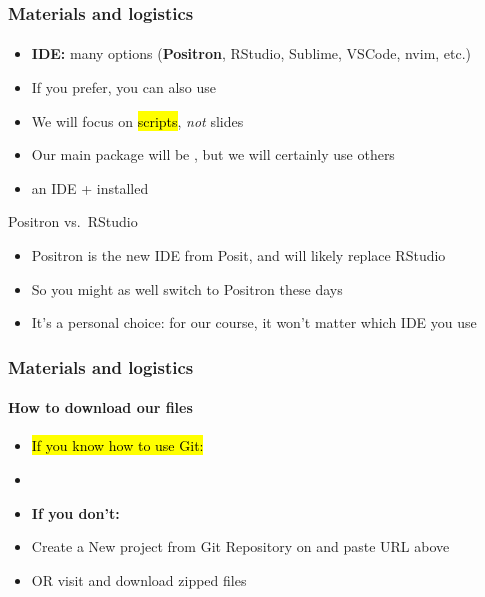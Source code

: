 \documentclass[xcolor=dvipsnames, handout, onlymath, 10pt, aspectratio=169]{beamer}
\begin{document}
\begin{frame}
	\frametitle{Materials and logistics}
	\framesubtitle{}

	\begin{itemize}
		\item[\winner] \textbf{IDE:} many options (\textbf{Positron}, RStudio, Sublime, VSCode, nvim, etc.)
		\item If you prefer, you can also use 
		\item We will focus on \hl{scripts}, \textit{not} slides
		\item Our main package will be , but we will certainly use others 
		\item[]  an IDE +  installed
	\end{itemize}


	\begin{importanttitle}{Positron vs.\ RStudio}
		\begin{itemize}
			\item Positron is the new IDE from Posit, and will likely replace RStudio
			\item So you might as well switch to Positron these days
			\item [\winner] It's a personal choice: for our course, it won't matter which IDE you use
		\end{itemize}
	\end{importanttitle}


\end{frame}


\begin{frame}
	\frametitle{Materials and logistics}
	\framesubtitle{How to download our files}

	\begin{itemize}
		\item \hl{If you know how to use Git:} 
		\item []
		\item[\winner] \textbf{If you don't:}
		\item Create a New project from Git Repository on  and paste URL above
		\item OR visit  and download zipped files
	\end{itemize}
\end{frame}
\end{document}
